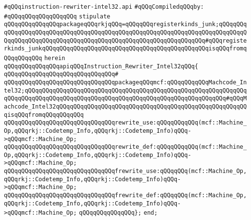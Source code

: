 \label{src/lib/compiler/back/low/intel32/regor/instruction-rewriter-intel32.api}
\verb|#qQQqinstruction-rewriter-intel32.api|\newline
\newline
\verb|#qQQqCompiledqQQqby:|\newline
\verb|#qQQqqQQqqQQqqQQqqQQq|\newline
\newline
\verb|stipulate|\newline
\verb|qQQqqQQqqQQqqQQqpackageqQQqrkjqQQq=qQQqqQQqregisterkinds_junk;qQQqqQQqqQQqqQQqqQQqqQQqqQQqqQQqqQQqqQQqqQQqqQQqqQQqqQQqqQQqqQQqqQQqqQQqqQQqqQQqqQQqqQQqqQQqqQQqqQQqqQQqqQQqqQQqqQQqqQQqqQQqqQQqqQQqqQQq#qQQqregisterkinds_junkqQQqqQQqqQQqqQQqqQQqqQQqqQQqqQQqqQQqqQQqqQQqqQQqisqQQqfromqQQqqQQqqQQq|\newline
\verb|herein|\newline
\newline
\verb|qQQqqQQqqQQqqQQqapiqQQqInstruction_Rewriter_Intel32qQQq{|\newline
\verb|qQQqqQQqqQQqqQQqqQQqqQQqqQQqqQQq#|\newline
\verb|qQQqqQQqqQQqqQQqqQQqqQQqqQQqqQQqpackageqQQqmcf:qQQqqQQqqQQqMachcode_Intel32;qQQqqQQqqQQqqQQqqQQqqQQqqQQqqQQqqQQqqQQqqQQqqQQqqQQqqQQqqQQqqQQqqQQqqQQqqQQqqQQqqQQqqQQqqQQqqQQqqQQqqQQqqQQqqQQqqQQqqQQqqQQqqQQq#qQQqMachcode_Intel32qQQqqQQqqQQqqQQqqQQqqQQqqQQqqQQqqQQqqQQqqQQqqQQqqQQqqQQqisqQQqfromqQQqqQQqqQQq|\newline
\newline
\verb|qQQqqQQqqQQqqQQqqQQqqQQqqQQqqQQqrewrite_use:qQQqqQQqqQQq(mcf::Machine_Op,qQQqrkj::Codetemp_Info,qQQqrkj::Codetemp_Info)qQQq->qQQqmcf::Machine_Op;|\newline
\verb|qQQqqQQqqQQqqQQqqQQqqQQqqQQqqQQqrewrite_def:qQQqqQQqqQQq(mcf::Machine_Op,qQQqrkj::Codetemp_Info,qQQqrkj::Codetemp_Info)qQQq->qQQqmcf::Machine_Op;|\newline
\newline
\verb|qQQqqQQqqQQqqQQqqQQqqQQqqQQqqQQqfrewrite_use:qQQqqQQq(mcf::Machine_Op,qQQqrkj::Codetemp_Info,qQQqrkj::Codetemp_Info)qQQq->qQQqmcf::Machine_Op;|\newline
\verb|qQQqqQQqqQQqqQQqqQQqqQQqqQQqqQQqfrewrite_def:qQQqqQQq(mcf::Machine_Op,qQQqrkj::Codetemp_Info,qQQqrkj::Codetemp_Info)qQQq->qQQqmcf::Machine_Op;|\newline
\verb|qQQqqQQqqQQqqQQq};|\newline
\verb|end;|\newline

